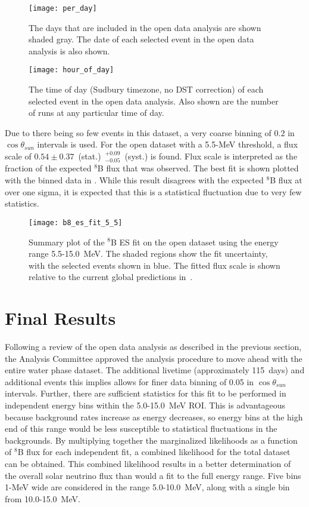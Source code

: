 \begin{figure}
\centering
\texttt{[image: per\_day]}
\caption{The {\snop} days that are included in the open data analysis are shown shaded gray.
The date of each selected event in the open data analysis is also shown.}
\label{fig:solar:opendata}
\end{figure}


\begin{figure}
\centering
\texttt{[image: hour\_of\_day]}
\caption{The time of day (Sudbury timezone, no DST correction) of each selected event in the open data analysis.
Also shown are the number of runs at any particular time of day.}
\label{fig:solar:tod}
\end{figure}


Due to there being so few events in this dataset, a very coarse binning of $0.2$ in $\cos{\theta_{sun}}$ intervals is used.
For the open dataset with a 5.5-MeV threshold, a flux scale of $0.54 \pm 0.37$~(stat.)~$^{+0.09}_{-0.05}$~(syst.) is found.
Flux scale is interpreted as the fraction of the expected $^8$B flux that was observed.
The best fit is shown plotted with the binned data in .
While this result disagrees with the expected $^8$B flux at over one sigma, it is expected that this is a statistical fluctuation due to very few statistics.

\begin{figure}
\centering
\texttt{[image: b8\_es\_fit\_5\_5]}
\caption{
Summary plot of the $^8$B ES fit on the open dataset using the energy range 5.5-15.0~MeV.
The shaded regions show the fit uncertainty, with the selected events shown in blue.
The fitted flux scale is shown relative to the current global predictions in~\cite{GlobalSolarFlux}.
}
\label{fig:solar:open55}
\end{figure}

\section{Final Results}
\label{sec:solar:updated}

Following a review of the open data analysis as described in the previous section, the {\snop} Analysis Committee approved the analysis procedure to move ahead with the entire {\snop} water phase dataset.
The additional livetime (approximately 115~days) and additional events this implies allows for finer data binning of 0.05 in $\cos{\theta_{sun}}$ intervals.
Further, there are sufficient statistics for this fit to be performed in independent energy bins within the 5.0-15.0~MeV ROI.
This is advantageous because background rates increase as energy decreases, so energy bins at the high end of this range would be less susceptible to statistical fluctuations in the backgrounds.
By multiplying together the marginalized likelihoods as a function of $^8$B flux for each independent fit, a combined likelihood for the total dataset can be obtained.
This combined likelihood results in a better determination of the overall solar neutrino flux than would a fit to the full energy range.
Five bins 1-MeV wide are considered in the range 5.0-10.0~MeV, along with a single bin from 10.0-15.0~MeV.

